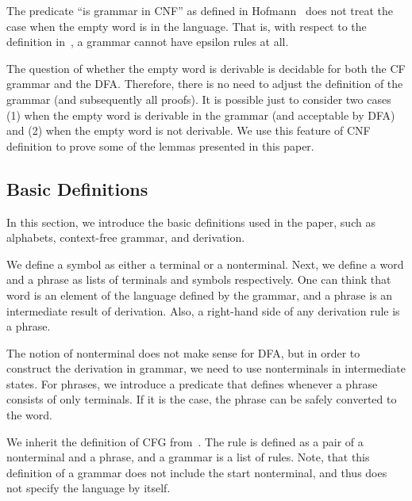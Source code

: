 The predicate ``is grammar in CNF'' as defined in Hofmann~\cite{smolkaHofmann2016} does not treat the case when the empty word is in the language. That is, with respect to the definition in~\cite{smolkaHofmann2016}, a grammar cannot have epsilon rules at all.

The question of whether the empty word is derivable is decidable for both the CF grammar and the DFA. Therefore, there is no need to adjust the definition of the grammar (and subsequently all proofs). It is possible just to consider two cases (1) when the empty word is derivable in the grammar (and acceptable by DFA) and (2) when the empty word is not derivable. We use this feature of CNF definition to prove some of the lemmas presented in this paper.

\subsection{Basic Definitions}

In this section, we introduce the basic definitions used in the paper, such as alphabets, context-free grammar, and derivation.

We define a symbol as either a terminal or a nonterminal.
Next, we define a word and a phrase as lists of terminals and symbols respectively.
One can think that word is an element of the language defined by the grammar, and a phrase is an intermediate result of derivation.
Also, a right-hand side of any derivation rule is a phrase.


The notion of nonterminal does not make sense for DFA, but in order to construct the derivation in grammar, we need to use nonterminals in intermediate states. For phrases, we introduce a predicate that defines whenever a phrase consists of only terminals. If it is the case, the phrase can be safely converted to the word.

We inherit the definition of CFG from~\cite{smolkaHofmann2016}. The rule is defined as a pair of a nonterminal and a phrase, and a grammar is a list of rules.
Note, that this definition of a grammar does not include the start nonterminal, and thus does not specify the language by itself.

